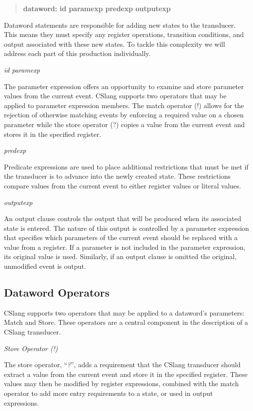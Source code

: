 \begin{quote}
\centering
\textbf{dataword: id paramexp predexp outputexp}
\end{quote}

Dataword statements are responsible for adding new states to the
transducer.  This means they must specify any register operations,
transition conditions, and output associated with these new states.  To
tackle this complexity we will address each part of this production
individually.

\textit{id paramexp}

The parameter expression offers an opportunity to examine and store
parameter values from the current event.  CSlang supports two operators
that may be applied to parameter expression members.  The match operator
(!) allows for the rejection of otherwise matching events
by enforcing a required value on a
chosen parameter while the store operator (?) copies a value from the
current event and stores it in the specified register.


\textit{predexp}

Predicate expressions are used to place additional restrictions that must
be met if the transducer is to advance into the newly created state.  These
restrictions compare values from the current event to either register
values or literal values.

\textit{outputexp}

An output clause controls the output that will be produced when its
associated state is entered.  The nature of this output is controlled by a
parameter expression that specifies which parameters of the current event
should be replaced with a value from a register.  If a parameter is not
included in the parameter expression, its original value is used.
Similarly,
if an output clause is omitted the original, unmodified event is output.

\subsection{Dataword Operators}

CSlang supports two operators that may be applied to a dataword's
parameters: Match and Store.  These operators are a central component in
the description of a CSlang transducer.

\textit{Store Operator (!)}

The store operator, ``\textit{?}'', adds a requirement that the
CSlang transducer should extract a value from the current event and store
it in the specified register.  These values may then be modified by
register expressions, combined with the match operator to add more
entry requirements to a state, or used in output expressions.

